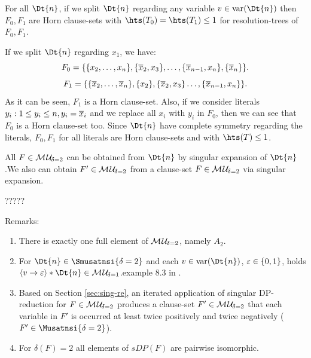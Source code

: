 \documentclass{report}
\begin{document}
\begin{lem}\label{lem:mu2-horn-tree}
For all $\Dt{n}$, if we split $\Dt{n}$ regarding any variable $v \in \var(\Dt{n})$ then $F_0, F_1$ are Horn clause-sets with  $\hts(T_0)= \hts(T_1) \le 1$ for resolution-trees of $F_0, F_1$.
\end{lem}
\begin{prf}
If we split $\Dt{n}$ regarding $x_1$, we have:
\begin{displaymath}
F_0=\{ \{ x_2,\dots,x_n \},\{ \overline x_2,x_3 \},\dots, \{ \overline x_{n-1},x_n \},\{ \overline x_n \} \}.
\end{displaymath}
\begin{displaymath}
F_1=\{ \{ \overline x_2,\dots,\overline x_n \},\{ x_2 \},\{ \overline x_2,x_3 \}\dots, \{ \overline x_{n-1},x_n \} \}.
\end{displaymath}
As it can be seen, $F_1$ is a Horn clause-set. Also, if we consider literals $y_i: 1 \le y_i \le n, y_i=\overline x_i$ and we replace all $x_i$ with $y_i$ in  $F_0$, then we can see that $F_0$ is a Horn clause-set too. Since $\Dt{n}$ have complete symmetry regarding the literals, $F_0, F_1$ for all literals are Horn clause-sets and with $\hts(T) \le 1$.
\end{prf}

\begin{lem}\label{lem:mu2-build}
All $F \in \mathcal{M\hspace{0.8pt}U}_{\!\delta=2}$ can be obtained from $\Dt{n}$ by singular expansion of  $\Dt{n}$ .We also can obtain $F' \in \mathcal{M\hspace{0.8pt}U}_{\!\delta=2}$ from a clause-set $F \in \mathcal{M\hspace{0.8pt}U}_{\!\delta=2}$ via singular expansion.
\end{lem}
\begin{prf}
?????
\end{prf}
Remarks:
  \begin{enumerate}
  \item There is exactly one full element of $\mathcal{M\hspace{0.8pt}U}_{\!\delta=2}$, namely $A_2$.
  \item For $\Dt{n} \in \Smusatnsi{\delta=2}$ and each $v \in \var(\Dt{n})$, $\varepsilon \in \{ 0,1 \}$, holds $\pao v{\ve} * \Dt{n} \in \Musati{\delta=1}$.example 8.3 in \cite{h9}.
  \item Based on Section \ref{sec:sing-re}, an iterated application of singular DP-reduction for $F \in \mathcal{M\hspace{0.8pt}U}_{\!\delta=2}$ produces a clause-set $F' \in \mathcal{M\hspace{0.8pt}U}_{\!\delta=2}$ that each variable in $F'$ is occurred at least twice positively and twice negatively ($F' \in  \Musatnsi{\delta=2}$).
  \item For $\delta(F) = 2$ all elements of $sDP(F)$ are pairwise isomorphic.
  \end{enumerate}
  
\end{document}
